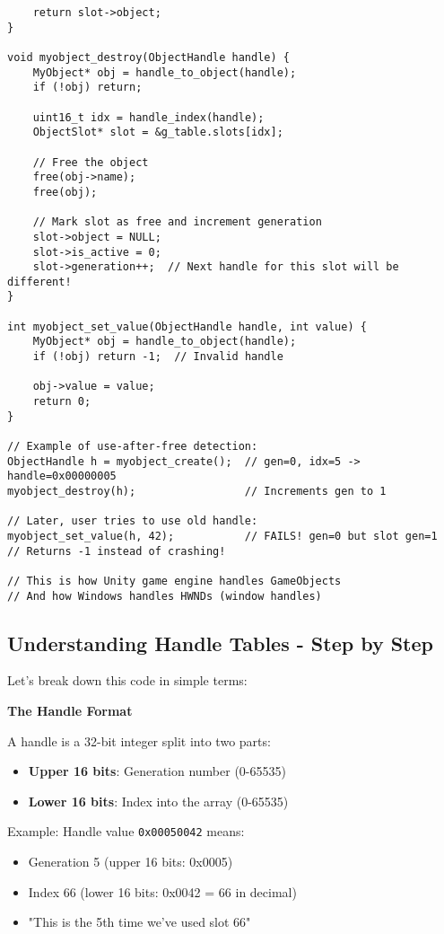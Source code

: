 \begin{lstlisting}
    return slot->object;
}

void myobject_destroy(ObjectHandle handle) {
    MyObject* obj = handle_to_object(handle);
    if (!obj) return;

    uint16_t idx = handle_index(handle);
    ObjectSlot* slot = &g_table.slots[idx];

    // Free the object
    free(obj->name);
    free(obj);

    // Mark slot as free and increment generation
    slot->object = NULL;
    slot->is_active = 0;
    slot->generation++;  // Next handle for this slot will be different!
}

int myobject_set_value(ObjectHandle handle, int value) {
    MyObject* obj = handle_to_object(handle);
    if (!obj) return -1;  // Invalid handle

    obj->value = value;
    return 0;
}

// Example of use-after-free detection:
ObjectHandle h = myobject_create();  // gen=0, idx=5 -> handle=0x00000005
myobject_destroy(h);                 // Increments gen to 1

// Later, user tries to use old handle:
myobject_set_value(h, 42);           // FAILS! gen=0 but slot gen=1
// Returns -1 instead of crashing!

// This is how Unity game engine handles GameObjects
// And how Windows handles HWNDs (window handles)
\end{lstlisting}

\subsection*{Understanding Handle Tables - Step by Step}

Let's break down this code in simple terms:

\textbf{The Handle Format}

A handle is a 32-bit integer split into two parts:
\begin{itemize}
    \item \textbf{Upper 16 bits}: Generation number (0-65535)
    \item \textbf{Lower 16 bits}: Index into the array (0-65535)
\end{itemize}

Example: Handle value \texttt{0x00050042} means:
\begin{itemize}
    \item Generation 5 (upper 16 bits: 0x0005)
    \item Index 66 (lower 16 bits: 0x0042 = 66 in decimal)
    \item "This is the 5th time we've used slot 66"
\end{itemize}

